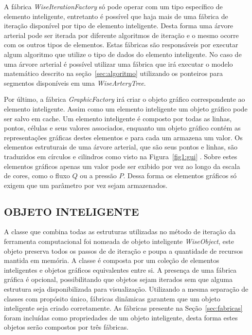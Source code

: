 \documentclass[a4paper,12pt]{monografia}
\theoremstyle{plain}
\theoremstyle{definition}
\theoremstyle{remark}
\begin{document}
A fábrica \textit{WiseIterationFactory} só pode operar com um tipo específico de elemento inteligente, entretanto é possível que haja mais de uma fábrica de iteração disponível por tipo de elemento inteligente. Desta forma uma árvore arterial pode ser iterada por diferente algoritmos de iteração e o mesmo ocorre com os outros tipos de elementos. Estas fábricas são responsáveis por executar algum algoritmo que utilize o tipo de dados do elemento inteligente. No caso de uma árvore arterial é possível utilizar uma fábrica que irá executar o modelo matemático descrito na seção~\ref{sec:algoritmo} utilizando os ponteiros para segmentos disponíveis em uma \textit{WiseArteryTree}.

Por último, a fábrica \textit{GraphicFactory} irá criar o objeto gráfico correspondente ao elemento inteligente. Assim como um elemento inteligente um objeto gráfico pode ser salvo em cache.  Um elemento inteligente é composto por todas as linhas, pontos, células e seus valores associados, enquanto um objeto gráfico contém as representações gráficas destes elementos e para cada um armazena um valor. Os elementos estruturais de uma árvore arterial, que são seus pontos e linhas, são traduzidos em círculos e cilindros como visto na Figura~\ref{fig1:gui} . Sobre estes elementos gráficos apenas um valor pode ser exibido por vez ao longo da escala de cores, como o fluxo $Q$ ou a pressão $P$. Dessa forma os elementos gráficos só exigem que um parâmetro por vez sejam armazenados.


\subsection{OBJETO INTELIGENTE}\label{sec:objeto_inteligente}

A classe que combina todas as estruturas utilizadas no método de iteração da ferramenta computacional foi nomeada de objeto inteligente \textit{WiseObject}, este objeto preserva todos os passos de de iteração e poupa a quantidade de recursos mantida em memória. A classe é composta por um coleção de elementos inteligentes e objetos gráficos equivalentes entre si. A presença de uma fábrica gráfica é opcional, possibilitando que objetos sejam iterados sem que alguma estrutura seja disponibilizada para visualização. Utilizando a mesma separação de classes com propósito único, fábricas dinâmicas garantem que um objeto inteligente seja criado corretamente. As fábricas presente na Seção~\ref{sec:fabricas} foram incluídas como propriedades de um objeto inteligente, desta forma estes objetos serão compostos por três fábricas.
\end{document}
